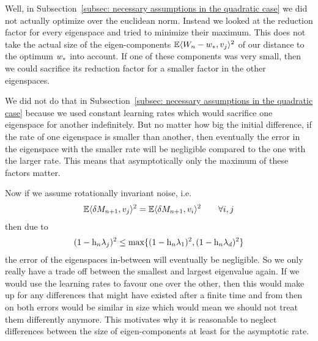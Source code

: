 Well, in Subsection~\ref{subsec: necessary assumptions in the quadratic case}
we did not actually optimize over the euclidean norm. Instead we looked at the
reduction factor for every eigenspace and tried to minimize their maximum.
This does not take the actual size of the eigen-components
\(\mathbb{E}\langle W_n-w_*, v_j\rangle^2\) of our distance to the optimum
\(w_*\) into account. If one of these components was very small, then
we could sacrifice its reduction factor for a smaller factor in the other
eigenspaces.

We did not do that in Subsection~\ref{subsec: necessary assumptions
in the quadratic case} because we used constant learning rates which would
sacrifice one eigenspace for another indefinitely. But no matter how big the
initial difference, if the rate of one eigenspace is smaller than another, then
eventually the error in the eigenspace with the smaller rate will be
negligible compared to the one with the larger rate. This means that
asymptotically only the maximum of these factors matter.

Now if we assume rotationally invariant noise, i.e.
\begin{align*}
	\mathbb{E}\langle\delta M_{n+1},v_j\rangle^2 = \mathbb{E}\langle\delta M_{n+1}, v_i\rangle^2
	\qquad \forall i,j
\end{align*}
then due to
\begin{align*}
	(1-\text{h}_n \lambda_j)^2
	\le \max \{ (1-\text{h}_n\lambda_1)^2, (1-\text{h}_n\lambda_d)^2 \}
\end{align*}
the error of the eigenspaces in-between will eventually be negligible. So we 
only really have a trade off between the smallest and largest eigenvalue again.
If we would use the learning rates to favour one over the other, then this would
make up for any differences that might have existed after a finite time and
from then on both errors would be similar in size which would mean we should
not treat them differently anymore. This motivates why it is reasonable to
neglect differences between the size of eigen-components at least for the
asymptotic rate.

